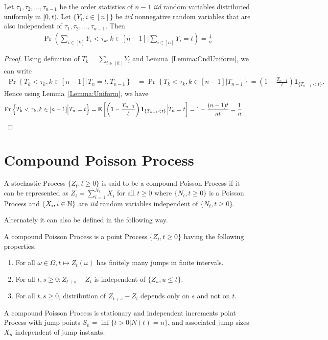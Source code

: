 \documentclass[a4paper,english,10pt]{article}
\begin{document}
\begin{lem}
\label{Lemma:Final}
Let $\tau_1, \tau_2, \ldots, \tau_{n-1}$ be the order statistics of $n-1$ \emph{iid} random variables distributed uniformly in $[0,t)$. Let $\{Y_i,i\in [n]\}$	be \emph{iid} nonnegative random variables that are also independent of $\tau_1, \tau_2, \ldots, \tau_{n-1}$. Then
\begin{align*}
\Pr(\sum_{i \in [k]}Y_i < \tau_k,k \in [n-1] |\sum_{i \in [n]}Y_i=t)=\frac{1}{n}
\end{align*}
\end{lem}
\begin{proof} Using definition of $T_k = \sum_{i \in [k]}Y_i$ and Lemma~\ref{Lemma:CndUniform}, we can write
\begin{align*}
\Pr\left\{ T_k<\tau_k ,k \in [n-1] \Big| T_n=t, T_{n-1} \right\}
&= \Pr\left\{T_k<\tau_k,k \in [n-1] \Big| T_{n-1}\right\}=\left(1-\frac{T_{n-1}}{t}\right) \textbf{1}_{\{T_{n-1} < t\}}.
\end{align*}
Hence using Lemma~\ref{Lemma:Uniform}, we have
\begin{align*}
\Pr\left\{T_k<\tau_k,k \in [n-1] \Big| T_n=t\right\} &= \mathbb{E}\left[\left(1-\frac{T_{n-1}}{t}\right) \textbf{1}_{\{T_{n-1} < t\}} \Big|T_n=t\right] = 1-\frac{(n-1)t}{nt} =\frac{1}{n}.
\end{align*}
\end{proof}

\section{Compound Poisson Process}
\begin{defn}
A stochastic Process $\{Z_t,t \geqslant 0\}	$ is said to be a compound Poisson Process if it can be represented as $Z_t=\sum_{i=1}^{N_t}X_i$ for all $t\geq 0$ where $\{N_t,t\geq 0\}$ is a Poisson Process and $\{X_i, i\in \mathbb{N}\}$ are \emph{iid} random variables independent of $\{N_t, t\geq 0\}$.
\end{defn}
Alternately it can also be defined in the following way.
\begin{defn}
A compound Poisson Process is a point Process \{$Z_t,t \geq 0$\} having the following properties.
\begin{enumerate}
	\item For all $\omega \in \Omega, t \longmapsto Z_t(\omega)$ has finitely many jumps in finite intervals.
	\item For all $t,s \geq 0; Z_{t+s}-Z_t$ is independent of $\{Z_u, u\leq t\}$.
	\item For all $t,s \geq 0$, distribution of $Z_{t+s}-Z_t$ depends only on $s$ and not on $t$.
\end{enumerate}	
\end{defn}
\begin{defn} A compound Poisson Process is stationary and independent increments point Process with jump points $S_n=\inf \{t>0 | N(t)=n\}$, and associated jump sizes $X_n$ independent of jump instants.%
\end{defn}
\end{document}
